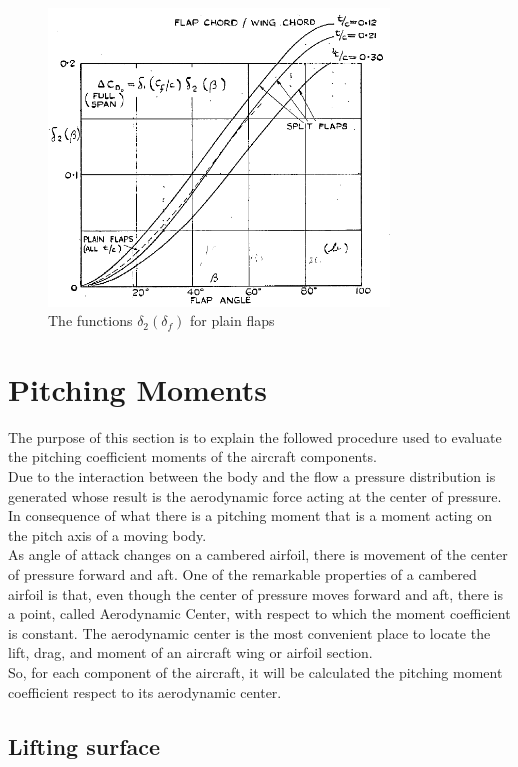%
\begin{figure}[H]
\centering
\includegraphics[height=7.9cm]{Immagini/Delta2_Plain}
\caption{The functions $\delta_2\left(\delta_f\right)$ for plain flaps}
\label{fig:Delta2Plain}
\end{figure}
%


\section{Pitching Moments}
The purpose of this section is to explain the followed procedure used to evaluate the pitching coefficient moments of the aircraft components.\\
Due to the interaction between the body and the flow a pressure distribution is generated whose result is the aerodynamic force acting at the center of pressure. In consequence of what there is a pitching moment that is a moment acting on the pitch axis of a moving body. \\
As angle of attack changes on a cambered airfoil, there is movement of the center of pressure forward and aft.  One of the remarkable properties of a cambered airfoil is that, even though the center of pressure moves forward and aft, there is a point, called Aerodynamic Center, with respect to which the moment coefficient is constant. The aerodynamic center is the most convenient place to locate the lift, drag, and moment of an aircraft wing or airfoil section.\\
So, for each component of the aircraft, it will be calculated the pitching moment coefficient respect to its aerodynamic center.



\subsection{Lifting surface}

